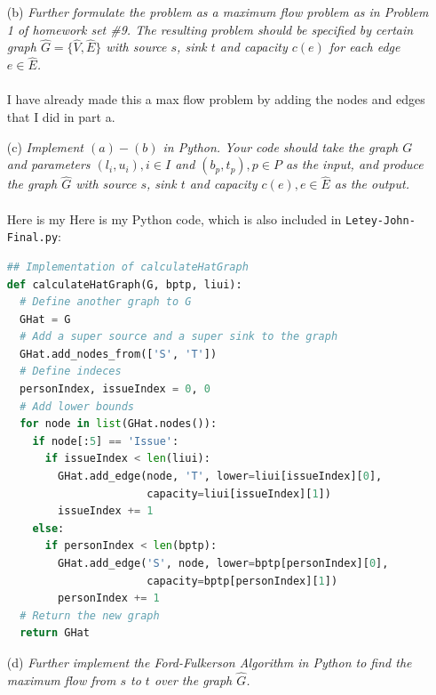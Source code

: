 \documentclass[12pt]{article}
\begin{document}
{\begin{enumerate}
My first step to creating my graph is to copy the old graph and add a super source $S$ and a super sink $T$. Then, I connect each person to the super source with an edge going from the super source to the person with lower bound $b_p$ and capacity $t_p$. I also connect each issue to the super sink with an edge going from the issue to the super sink with lower bound $l_i$ and capacity $u_i$.
\item[(b)]\textsl{Further formulate the problem as a maximum flow problem as in Problem 1 of homework set \#9. The resulting problem should be specified by certain graph $\hat{G} = \{\hat{V}, \hat{E}\}$ with source $s$, sink $t$ and capacity $c(e)$ for each edge $e \in \hat{E}$.}\\ \\
I have already made this a max flow problem by adding the nodes and edges that I did in part a.
\item[(c)]\textsl{Implement $(a)-(b)$ in Python. Your code should take the graph $G$ and parameters $(l_i, u_i), i \in I$ and $(b_p, t_p), p \in P$ as the input, and produce the graph $\hat{G}$ with source $s$, sink $t$ and capacity $c(e), e \in \hat{E}$ as the output.}\\ \\
Here is my Here is my Python code, which is also included in \texttt{Letey-John-Final.py}:
\begin{lstlisting}[language=Python]
## Implementation of calculateHatGraph
def calculateHatGraph(G, bptp, liui):
  # Define another graph to G
  GHat = G
  # Add a super source and a super sink to the graph
  GHat.add_nodes_from(['S', 'T'])
  # Define indeces
  personIndex, issueIndex = 0, 0
  # Add lower bounds
  for node in list(GHat.nodes()):
    if node[:5] == 'Issue':
      if issueIndex < len(liui):
        GHat.add_edge(node, 'T', lower=liui[issueIndex][0], 
                      capacity=liui[issueIndex][1])
        issueIndex += 1
    else:
      if personIndex < len(bptp):
        GHat.add_edge('S', node, lower=bptp[personIndex][0], 
                      capacity=bptp[personIndex][1])
        personIndex += 1
  # Return the new graph
  return GHat
\end{lstlisting}
\item[(d)]\textsl{Further implement the Ford-Fulkerson Algorithm in Python to find the maximum flow from $s$ to $t$ over the graph $\hat{G}$.}\\ \\

\end{enumerate}}
\end{document}
